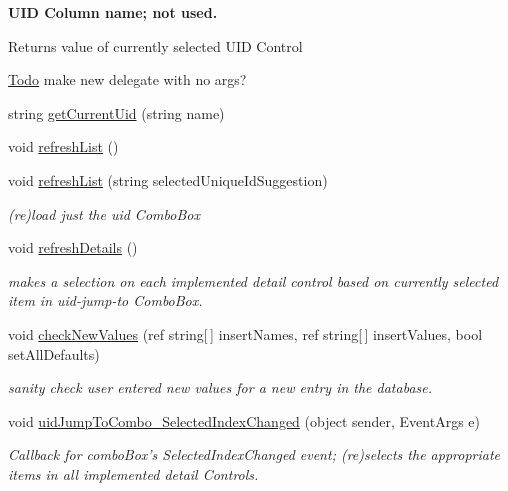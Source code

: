 \begin{Indent}{\bf UID Column name; not used.}
{\begin{DoxyReturn}{Returns}
value of currently selected UID Control 
\end{DoxyReturn}
\begin{Desc}
\item[\hyperlink{todo__todo000045}{Todo}]make new delegate with no args? \end{Desc}
}\begin{DoxyCompactItemize}
\item 
string \hyperlink{class_ias_pbx_config_1_1_trunk_details_adbb8e5a6091b5a602227d4571fab3a06}{getCurrentUid} (string name)
\item 
void \hyperlink{class_ias_pbx_config_1_1_trunk_details_a043ccba78a5c1bde053f3f7e23502b33}{refreshList} ()
\item 
void \hyperlink{class_ias_pbx_config_1_1_trunk_details_ab5c0db30702c3714191a3161c15bbbe5}{refreshList} (string selectedUniqueIdSuggestion)
\begin{DoxyCompactList}\small\item\em (re)load just the uid ComboBox \item\end{DoxyCompactList}\item 
void \hyperlink{class_ias_pbx_config_1_1_trunk_details_aacce011c33fa9fed315eb27c9d9643ea}{refreshDetails} ()
\begin{DoxyCompactList}\small\item\em makes a selection on each implemented detail control based on currently selected item in uid-\/jump-\/to ComboBox. \item\end{DoxyCompactList}\item 
void \hyperlink{class_ias_pbx_config_1_1_trunk_details_acdc7d06a5f58918faabd4057300585d3}{checkNewValues} (ref string\mbox{[}$\,$\mbox{]} insertNames, ref string\mbox{[}$\,$\mbox{]} insertValues, bool setAllDefaults)
\begin{DoxyCompactList}\small\item\em sanity check user entered new values for a new entry in the database. \item\end{DoxyCompactList}\item 
void \hyperlink{class_ias_pbx_config_1_1_trunk_details_a05b0359576cfc66eda821a9e8e8f7e25}{uidJumpToCombo\_\-SelectedIndexChanged} (object sender, EventArgs e)
\begin{DoxyCompactList}\small\item\em Callback for comboBox's SelectedIndexChanged event; (re)selects the appropriate items in all implemented detail Controls. \item\end{DoxyCompactList}\item 

\end{DoxyCompactItemize}
\end{Indent}
